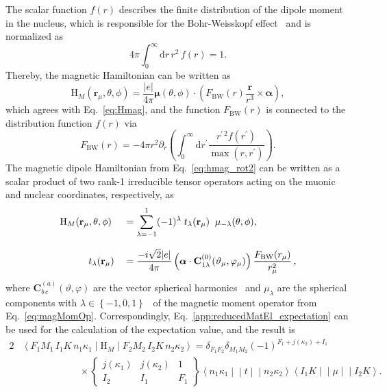 The scalar function $f(r)$ describes the finite distribution of the dipole moment in the nucleus, which is responsible for the Bohr-Weisskopf effect~\cite{bohrWeisskopf1950} and is normalized as
\begin{equation}
4\pi\int_0^\infty \text{d}r\,r^2\,f(r)=1.
\end{equation}
Thereby, the magnetic Hamiltonian can be written as
\begin{equation}
\label{eq:hmag_rot2}
\text{H}_M(\mathbf{r}_\mu,\theta,\phi) =\frac{|e|}{4\pi}\boldsymbol{\mu}(\theta,\phi)\cdot
\left( F_{\text{BW}}(r)\frac{\mathbf{r}}{r^3}\times \boldsymbol{\alpha}\right),
\end{equation}
which agrees with Eq.~\eqref{eq:Hmag}, and the function $F_{\text{BW}}(r)$ is connected to the distribution function $f(r)$ via
\begin{equation}
F_{\text{BW}}(r)=-4\pi r^2\partial_r \left(\int_0^\infty\text{d}r^\prime \frac{r^{\prime\,2}f(r^\prime)}{\max (r,r^\prime)}\right).
\end{equation}
The magnetic dipole Hamiltonian from Eq.~\eqref{eq:hmag_rot2} can be written as a scalar product of two rank-1 irreducible tensor operators acting on the muonic and nuclear coordinates, respectively, as~\cite{johnson2007}
\begin{alignat}{2}
&\text{H}_M  (\mathbf{r}_\mu,\theta,\phi) &&=\sum_{\lambda=-1}^1 (-1)^\lambda \;t_\lambda(\mathbf{r}_\mu) \;\;\mu_{-\lambda}(\theta,\phi),\notag\\[7.5pt]
&\qquad \quad t_\lambda(\mathbf{r}_\mu) &&= \frac{-i\sqrt{2}|e|}{4\pi}\left(\boldsymbol{\alpha}\cdot\mathbf{C}^{(0)}_{1\lambda}(\vartheta_\mu,\varphi_\mu)\right)\frac{F_{\text{BW}}(r_\mu)}{r_\mu^2}\,\notag,
\end{alignat}
where $\mathbf{C}^{(a)}_{b\,c}(\vartheta,\varphi)$ are the vector spherical harmonics~\cite[Section 7.]{varshalovich1988} and $\mu_\lambda$ are the spherical components with $\lambda \in \left\{-1,0,1\right\}$~\cite[Section 1.]{varshalovich1988} of the magnetic moment operator from Eq.~\eqref{eq:magMomOp}. Correspondingly, Eq.~\eqref{app:reducedMatEl_expectation} can be used for the calculation of the expectation value, and the result is
\begin{alignat}{2}
& \left<F_1M_1\,I_1K\,n_1\kappa_1 \middle|\text{H}_M \middle|F_2M_2\,I_2K\,n_2\kappa_2 \right> = \delta_{F_1F_2}\delta_{M_1M_2}(-1)^{F_1+j(\kappa_2)+I_1}\\[7.5pt]
&\qquad\qquad\qquad\times
\begin{Bmatrix}
j(\kappa_1)&j(\kappa_2)&1\\
I_2&I_1&F_1
\end{Bmatrix}
\left< n_1\kappa_1\middle|\middle|t \middle|\middle| n_2\kappa_2\right>
\left< I_1K\middle|\middle|\mu \middle|\middle|I_2K\right>.
\end{alignat}
